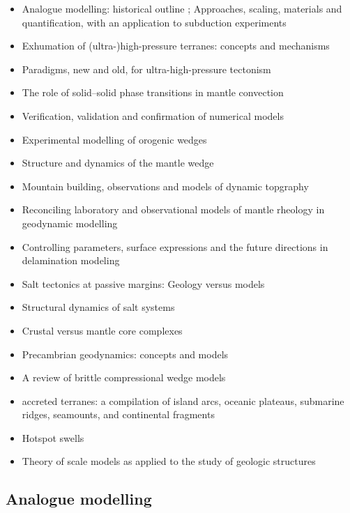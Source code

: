 \begin{itemize}
\item Analogue modelling: historical outline \cite{koyi97}; Approaches, scaling, materials and quantification, with an application to subduction experiments \cite{scst16}
\item Exhumation of (ultra-)high-pressure terranes: concepts and mechanisms \cite{warr13}
\item Paradigms, new and old, for ultra-high-pressure tectonism \cite{hage13}
\item The role of solid–solid phase transitions in mantle convection \cite{fada17}
\item Verification, validation and confirmation of numerical models \cite{orsb94}
\item Experimental modelling of orogenic wedges \cite{grmd12}
\item Structure and dynamics of the mantle wedge \cite{vank03}
\item Mountain building, observations and models of dynamic topgraphy \cite{flgm13,fabc13}
\item Reconciling laboratory and observational models of mantle rheology in geodynamic modelling \cite{king16}
\item Controlling parameters, surface expressions and the future directions in delamination modeling \cite{goue18}
\item Salt tectonics at passive margins: Geology versus models \cite{brfo11}
\item Structural dynamics of salt systems \cite{javs94}
\item Crustal versus mantle core complexes \cite{brst18}
\item Precambrian geodynamics: concepts and models \cite{gery14}
\item A review of brittle compressional wedge models \cite{buit12}
\item accreted terranes: a compilation of island arcs, oceanic
      plateaus, submarine ridges, seamounts, and continental fragments \cite{tebu14}
\item Hotspot swells \cite{kiad14}
\item Theory of scale models as applied to the study of geologic structures \cite{hubb37}

\end{itemize}

\subsection{Analogue modelling}

